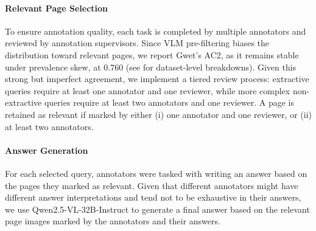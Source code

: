 \paragraph{Relevant Page Selection} To ensure annotation quality, each task is completed by multiple annotators and reviewed by annotation supervisors. Since VLM pre-filtering biases the distribution toward relevant pages, we report Gwet's AC2, as it remains stable under prevalence skew, at 0.760 (see  for dataset-level breakdowns). Given this strong but imperfect agreement, we implement a tiered review process: extractive queries require at least one annotator and one reviewer, while more complex non-extractive queries require at least two annotators and one reviewer. A page is retained as relevant if marked by either (i) one annotator and one reviewer, or (ii) at least two annotators.  %




\paragraph{Answer Generation} For each selected query, annotators were tasked with writing an answer based on the pages they marked as relevant. Given that different annotators might have different answer interpretations and tend not to be exhaustive in their answers, we use Qwen2.5-VL-32B-Instruct to generate a final answer based on the relevant page images marked by the annotators and their answers.

